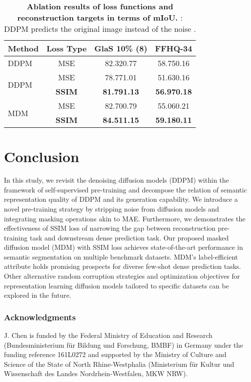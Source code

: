 \documentclass{article} \usepackage{iclr2024_conference,times}
\begin{document}
\begin{table}[!htp]
    \centering
    \caption{\textbf{Ablation results of loss functions and reconstruction targets in terms of mIoU.} : DDPM predicts the original image  instead of the noise .}
    \small \begin{tabular}{lccc}
        \toprule
         Method &Loss Type &GlaS 10\% (8) &FFHQ-34\\
        \midrule
        DDPM       &MSE &82.320.77 &58.750.16\\
        \midrule
        \multirow{2}{*}{DDPM}       &MSE &78.771.01 &51.630.16\\
        &\textbf{SSIM} &\textbf{81.791.13} &\textbf{56.970.18}\\
        \midrule
        \multirow{2}{*}{MDM}       &MSE &82.700.79 &55.060.21\\
        &\textbf{SSIM} &\textbf{84.511.15} &\textbf{59.180.11}\\
        \bottomrule
    \end{tabular}
    \label{SSIM}
\end{table}



\section{Conclusion}
In this study, we revisit the denoising diffusion models (DDPM) within the framework of self-supervised pre-training and decompose the relation of semantic representation quality of DDPM and its generation capability. We introduce a novel pre-training strategy by stripping noise from diffusion models and integrating masking operations akin to MAE. Furthermore, we demonstrates the effectiveness of SSIM loss of narrowing the gap between reconstruction pre-training task and downstream dense prediction task. Our proposed masked diffusion model (MDM) with SSIM loss achieves state-of-the-art performance in semantic segmentation on multiple benchmark datasets. MDM's label-efficient attribute holds promising prospects for diverse few-shot dense prediction tasks. Other alternative random corruption strategies and optimization objectives for representation learning diffusion models tailored to specific datasets can be explored in the future.

\subsubsection*{Acknowledgments}
J. Chen is funded by the Federal Ministry of Education and Research (Bundesministerium für
Bildung und Forschung, BMBF) in Germany under the funding reference 161L0272 and supported by
the Ministry of Culture and Science of the State of North Rhine-Westphalia (Ministerium für Kultur
und Wissenschaft des Landes Nordrhein-Westfalen, MKW NRW).
\end{document}
